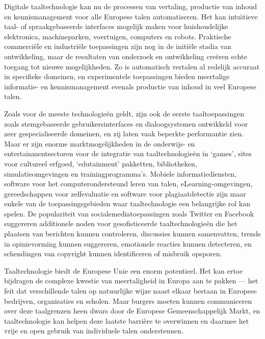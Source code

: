 \begin{multicols}{2}
    Digitale taaltechnologie kan nu de processen van vertaling, productie van inhoud en kennismanagement voor alle Europese talen automatiseren. Het kan intu{\"\i}tieve taal- of spraakgebaseerde interfaces mogelijk maken voor huishoudelijke elektronica, machineparken, voertuigen, computers en robots. Praktische commerci{\"e}le en industri{\"e}le toepassingen zijn nog in de initi{\"e}le stadia van ontwikkeling, maar de resultaten van onderzoek en ontwikkeling cre{\"e}ren echte toegang tot nieuwe mogelijkheden. Zo is automatisch vertalen al redelijk accuraat in specifieke domeinen, en experimentele toepassingen bieden meertalige informatie- en kennismanagement evenals productie van inhoud in veel Europese talen.

    Zoals voor de meeste technologie{\"e}n geldt, zijn ook de eerste taaltoepassingen zoals stemgebaseerde gebruikersinterfaces en dialoogsystemen ontwikkeld voor zeer gespecialiseerde domeinen, en zij laten vaak beperkte performantie zien. Maar er zijn enorme marktmogelijkheden in de onderwijs- en entertainmentsectoren voor de integratie van taaltechnologie{\"e}n in `games', sites voor cultureel erfgoed, `edutainment' pakketten, bibliotheken, simulatieomgevingen en trainingprogramma's. Mobiele informatiediensten, software voor het computerondersteund leren van talen, eLearning-omgevingen, gereedschappen voor zelfevaluatie en software voor plagiaatdetectie zijn maar enkele van de toepassingsgebieden waar taaltechnologie een belangrijke rol kan spelen. De populariteit van socialemediatoepassingen zoals Twitter en Facebook suggereren additionele noden voor gesofisticeerde taaltechnologie{\"e}n die het plaatsen van berichten kunnen controleren, discussies kunnen samenvatten, trends in opinievorming kunnen suggereren, emotionele reacties kunnen detecteren, en schendingen van copyright kunnen identificeren of misbruik opsporen.



    Taaltechnologie biedt de Europese Unie een enorm potentieel. Het kan ertoe bijdragen de complexe kwestie van meertaligheid in Europa aan te pakken --- het feit dat verschillende talen op natuurlijke wijze naast elkaar bestaan in Europese bedrijven, organisaties en scholen. Maar burgers moeten kunnen communiceren over deze taalgrenzen heen dwars door de Europese Gemeenschappelijk Markt, en taaltechnologie kan helpen deze laatste barri{\`e}re te overwinnen en daarmee het vrije en open gebruik van individuele talen ondersteunen.


\end{multicols}
